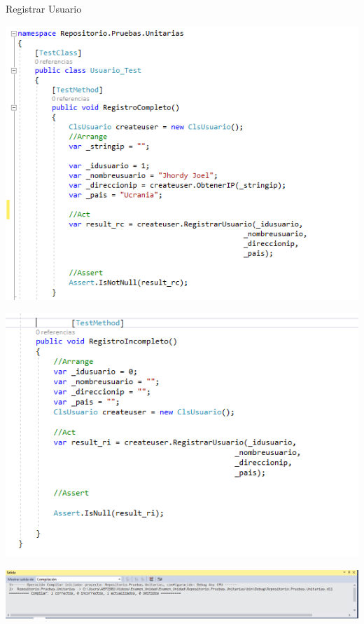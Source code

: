 \item
 Registrar Usuario
\begin{center}
\includegraphics[width=18cm]{./Imagenes/prueba4}
\end{center}
\begin{center}
\includegraphics[width=18cm]{./Imagenes/prueba41}
\end{center}


\begin{center}
\includegraphics[width=18cm]{./Imagenes/prueba44}
\end{center}